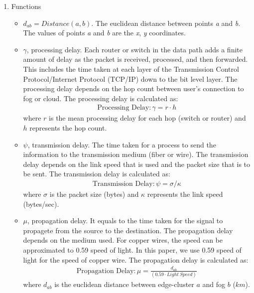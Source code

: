\documentclass[10pt,journal,compsoc]{IEEEtran}
\begin{document}
\begin{enumerate}
\item Functions
\begin{itemize}
\item $d_{ab} = Distance (\textit{a}, \textit{b})$. The euclidean distance between points \textit{a} and \textit{b}. The values of points \textit{a} and \textit{b} are the \textit{x}, \textit{y} coordinates.
\item $\gamma$, processing delay. Each router or switch in the data path adds a finite amount of delay as the packet is received, processed, and then forwarded. This includes the time taken at each layer of the Transmission Control Protocol/Internet Protocol (TCP/IP) down to the bit level layer. The processing delay depends on the hop count between user's connection to fog or cloud. The processing delay is calculated as: 
\begin{align}
\text{Processing Delay} : \gamma = r \cdot h %
\end{align}
where $r$ is the mean processing delay for each hop (switch or router) and $h$ represents the hop count.
\item $\psi$, transmission delay. The time taken for a process to send the information to the transmission medium (fiber or wire). The transmission delay depends on the link speed that is used and the packet size that is to be sent. The transmission delay is calculated as: 
\begin{align}
\text{Transmission Delay} : \psi =\sigma / \kappa
\end{align}
where $\sigma$ is the packet size (bytes) and $\kappa$ represents the link speed (bytes/sec).
\item  $\mu$, propagation delay. It equals to the time taken for the signal to propagete from the source to the destination. The propagation delay depends on the medium used. For copper wires, the speed can be approximated to 0.59 speed of light. In this paper, we use 0.59 speed of light for the speed of copper wire. The propagation delay is calculated as:  
\begin{align}
\text{Propagation Delay} : \mu = \frac{d_{ab}}{(0.59 \cdot Light\ Speed)}
\end{align}
where $d_{ab}$ is the euclidean distance between edge-cluster $a$ and fog $b$ ($km$). 


\end{itemize}
\end{enumerate}
\end{document}
